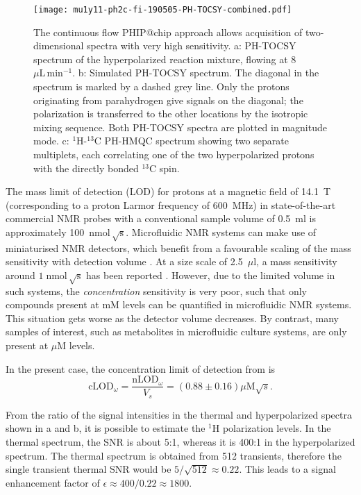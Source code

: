 \begin{figure}
	\centering
	\texttt{[image: mu1y11-ph2c-fi-190505-PH-TOCSY-combined.pdf]}
	\caption{
		The continuous flow PHIP@chip approach allows acquisition of
		two-dimensional spectra with very high sensitivity.
    a: PH-TOCSY spectrum of the hyperpolarized reaction mixture,
		flowing at 8~$\mu\mathrm{L}\,\text{min}^{-1}$.
    b: Simulated PH-TOCSY spectrum. The diagonal in the spectrum is marked by a dashed grey
		line. Only the protons originating from parahydrogen give signals on
		the diagonal; the polarization is transferred to the other locations by
		the isotropic mixing sequence. Both PH-TOCSY spectra are plotted in
    magnitude mode.
    c: $^1$H-$^{13}$C PH-HMQC spectrum
		showing two separate multiplets, each correlating one of the two
		hyperpolarized protons with the directly bonded $^{13}$C spin.
}
	\label{fig:PH-TOCSY-HMQC}
\end{figure}

The mass limit of detection (LOD) for
protons at a magnetic field of 14.1~T (corresponding to a proton Larmor frequency
of 600~MHz) in state-of-the-art commercial NMR probes with a
conventional sample volume of 0.5~ml is approximately
100~$\text{nmol}\,\sqrt{\text{s}}$.
Microfluidic NMR systems can make use of miniaturised NMR detectors,
which benefit from a favourable scaling of the mass sensitivity
with detection volume \cite{Olson:1995vu,Badilita:2011td,Zalesskiy:2014hi}. At a size scale
of 2.5~$\mu\mathrm{l}$, a mass sensitivity around
$1\;\text{nmol}\,\sqrt{\text{s}}$
has been reported \cite{Finch:2016gv}.
However, due to the limited volume in such systems,
the \emph{concentration} sensitivity is very poor, such that
only compounds present at mM levels can be quantified
in microfluidic NMR systems. This situation gets worse as the detector
volume decreases. By contrast, many samples of interest, such as
metabolites in microfluidic culture systems, are only present
at $\mu$M levels.

In the present
case, the concentration limit of detection from  is
\begin{equation}
\text{cLOD}_\omega =
\frac{\text{nLOD}_\omega}{V_s} = (0.88 ± 0.16)\mu\text{M}\sqrt{s}.
\end{equation}

From the ratio of the signal intensities in the thermal and hyperpolarized
spectra shown in a and b, it is possible to estimate the
$\mathrm{^1H}$ polarization levels. In the thermal spectrum, the SNR is about
5:1, whereas it is 400:1 in the hyperpolarized spectrum. The thermal spectrum is
obtained from 512 transients, therefore the single transient thermal SNR would
be $5/\sqrt{512}\approx 0.22$. This leads to a signal enhancement factor of
$\epsilon\approx 400/0.22 \approx 1800$.

